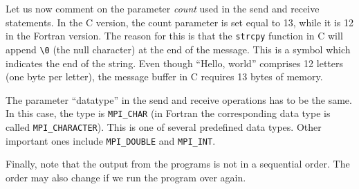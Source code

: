 Let us now comment on the parameter \emph{count} used in the send and receive
statements. In the C version, the count parameter is set equal to 13, while it
is 12 in the Fortran version. The reason for this is that the \texttt{strcpy}
function in C will append \texttt{\textbackslash 0} (the null character) at the
end of the message. This is a symbol which indicates the end of the string. Even
though ``Hello, world'' comprises 12 letters (one byte per letter), the message
buffer in C requires 13 bytes of memory.

The parameter ``datatype'' in the send and receive operations has to be the same.
In this case, the type is \texttt{MPI\_CHAR} (in Fortran the corresponding data
type is called \texttt{MPI\_CHARACTER}). This is one of several predefined data
types. Other important ones include \texttt{MPI\_DOUBLE} and \texttt{MPI\_INT}.

Finally, note that the output from the programs is not in a sequential order.
The order may also change if we run the program over again.
